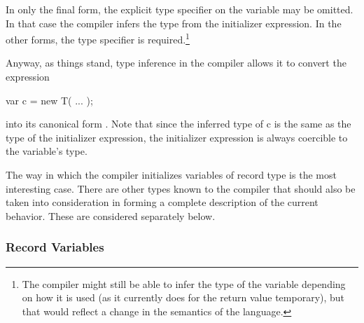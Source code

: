 In only the final form, the explicit type specifier on the variable may be omitted.  In that
case the compiler infers the type from the initializer expression.  In the other forms,
the type specifier is required.\footnote{The compiler might still be able to infer the type of the
variable depending on how it is used (as it currently does for the return value
temporary), but that would reflect a change in the semantics of the language.}

Anyway, as things stand, type inference in the compiler allows it to convert the
expression
\begin{chapel}
   var c = new T( ... );
\end{chapel}
into its canonical form .  Note that since the inferred type
of c is the same as the type of the initializer expression, the initializer expression is
always coercible to the variable's type.

The way in which the compiler initializes variables of record type is the most interesting
case.  There are other types known to the compiler that should also be taken into
consideration in forming a complete description of the current behavior.  These are
considered separately below.


\subsubsection{Record Variables}

